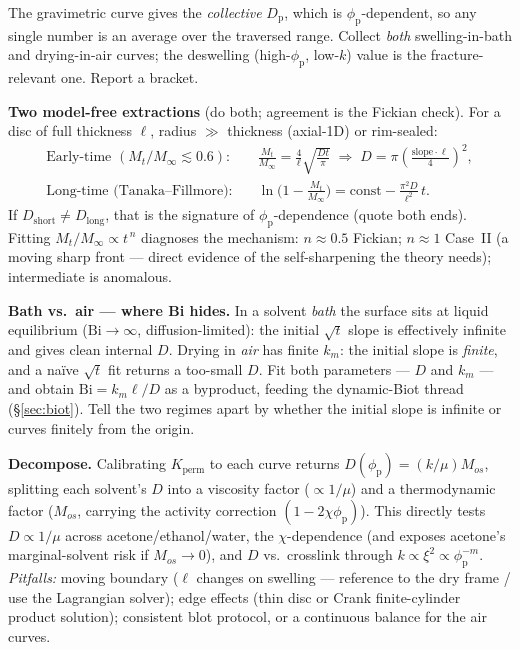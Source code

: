 \documentclass[12pt,letterpaper]{article}
\newcommand{\Dp}{D_{\mathrm{p}}}
\newcommand{\chiFH}{\chi}
\newcommand{\phip}{\phi_{\mathrm{p}}}
\newcommand{\Bi}{\mathrm{Bi}}
\begin{document}
\begin{intuitionbox}
The gravimetric curve gives the \emph{collective} $\Dp$, which is
$\phip$-dependent, so any single number is an average over the traversed range.
Collect \emph{both} swelling-in-bath and drying-in-air curves; the deswelling
(high-$\phip$, low-$k$) value is the fracture-relevant one. Report a bracket.
\end{intuitionbox}

\noindent\textbf{Two model-free extractions} (do both; agreement is the Fickian
check). For a disc of full thickness $\ell$, radius $\gg$ thickness (axial-1D) or
rim-sealed:
\begin{align}
\text{Early-time } (M_t/M_\infty\lesssim0.6):\quad & \frac{M_t}{M_\infty}=\frac{4}{\ell}\sqrt{\frac{Dt}{\pi}}
\;\Rightarrow\; D=\pi\!\left(\frac{\text{slope}\cdot\ell}{4}\right)^{\!2},\\
\text{Long-time (Tanaka--Fillmore):}\quad & \ln\!\Big(1-\frac{M_t}{M_\infty}\Big)=\text{const}-\frac{\pi^2 D}{\ell^2}\,t .
\end{align}
If $D_{\text{short}}\neq D_{\text{long}}$, that is the signature of
$\phip$-dependence (quote both ends). Fitting $M_t/M_\infty\propto t^{\,n}$
diagnoses the mechanism: $n\!\approx\!0.5$ Fickian; $n\!\approx\!1$ Case~II
(a moving sharp front --- direct evidence of the self-sharpening the theory
needs); intermediate is anomalous.

\begin{reviewbox}
\textbf{Bath vs.\ air --- where Bi hides.} In a solvent \emph{bath} the surface
sits at liquid equilibrium ($\Bi\to\infty$, diffusion-limited): the initial
$\sqrt{t}$ slope is effectively infinite and gives clean internal $D$. Drying in
\emph{air} has finite $k_m$: the initial slope is \emph{finite}, and a naïve
$\sqrt{t}$ fit returns a too-small $D$. Fit both parameters --- $D$ and $k_m$ ---
and obtain $\Bi=k_m\ell/D$ as a byproduct, feeding the dynamic-Biot thread
(\S\ref{sec:biot}). Tell the two regimes apart by whether the initial slope is
infinite or curves finitely from the origin.
\end{reviewbox}

\noindent\textbf{Decompose.} Calibrating $K_{\mathrm{perm}}$ to each curve returns
$D(\phip)=(k/\mu)M_{os}$, splitting each solvent's $D$ into a viscosity factor
($\propto1/\mu$) and a thermodynamic factor ($M_{os}$, carrying the activity
correction $(1-2\chiFH\phip)$). This directly tests $D\propto1/\mu$ across
acetone/ethanol/water, the $\chiFH$-dependence (and exposes acetone's
marginal-solvent risk if $M_{os}\to0$), and $D$ vs.\ crosslink through
$k\propto\xi^2\propto\phip^{-m}$. \emph{Pitfalls:} moving boundary ($\ell$ changes
on swelling --- reference to the dry frame / use the Lagrangian solver); edge
effects (thin disc or Crank finite-cylinder product solution); consistent blot
protocol, or a continuous balance for the air curves.
\end{document}
